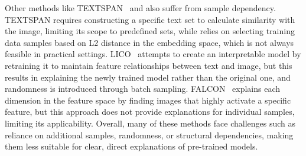 Other methods like TEXTSPAN~\citep{gandelsman2023interpreting} and \cite{hossainexplaining} also suffer from sample dependency. TEXTSPAN requires constructing a specific text set to calculate similarity with the image, limiting its scope to predefined sets, while \cite{hossainexplaining} relies on selecting training data samples based on L2 distance in the embedding space, which is not always feasible in practical settings. LICO~\citep{lei2024lico} attempts to create an interpretable model by retraining it to maintain feature relationships between text and image, but this results in explaining the newly trained model rather than the original one, and randomness is introduced through batch sampling. FALCON~\citep{kalibhat2023identifying} explains each dimension in the feature space by finding images that highly activate a specific feature, but this approach does not provide explanations for individual samples, limiting its applicability. Overall, many of these methods face challenges such as reliance on additional samples, randomness, or structural dependencies, making them less suitable for clear, direct explanations of pre-trained models.